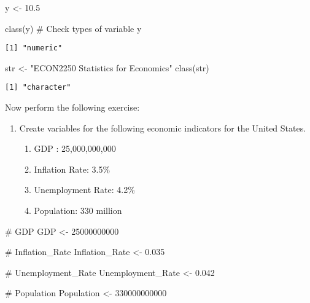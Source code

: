 \documentclass[
  letterpaper,
  DIV=11,
  numbers=noendperiod]{scrartcl}
\newenvironment{Shaded}{\begin{snugshade}}{\end{snugshade}}
\newcommand{\CommentTok}[1]{\textcolor[rgb]{0.37,0.37,0.37}{#1}}
\newcommand{\DecValTok}[1]{\textcolor[rgb]{0.68,0.00,0.00}{#1}}
\newcommand{\FloatTok}[1]{\textcolor[rgb]{0.68,0.00,0.00}{#1}}
\newcommand{\FunctionTok}[1]{\textcolor[rgb]{0.28,0.35,0.67}{#1}}
\newcommand{\NormalTok}[1]{\textcolor[rgb]{0.00,0.23,0.31}{#1}}
\newcommand{\OtherTok}[1]{\textcolor[rgb]{0.00,0.23,0.31}{#1}}
\newcommand{\StringTok}[1]{\textcolor[rgb]{0.13,0.47,0.30}{#1}}
\providecommand{\tightlist}{%
  \setlength{\itemsep}{0pt}\setlength{\parskip}{0pt}}\usepackage{longtable,booktabs,array}
\begin{document}
\begin{Shaded}
\begin{Highlighting}[]
\NormalTok{y }\OtherTok{\textless{}{-}} \FloatTok{10.5}

\FunctionTok{class}\NormalTok{(y) }\CommentTok{\# Check types of variable y}
\end{Highlighting}
\end{Shaded}

\begin{verbatim}
[1] "numeric"
\end{verbatim}

\begin{Shaded}
\begin{Highlighting}[]
\NormalTok{str }\OtherTok{\textless{}{-}} \StringTok{"ECON2250 Statistics for Economics"}
\FunctionTok{class}\NormalTok{(str)}
\end{Highlighting}
\end{Shaded}

\begin{verbatim}
[1] "character"
\end{verbatim}

Now perform the following exercise:

\begin{enumerate}
\def\labelenumi{\arabic{enumi}.}
\tightlist
\item
  Create variables for the following economic indicators for the United
  States.

  \begin{enumerate}
  \def\labelenumii{\alph{enumii}.}
  \tightlist
  \item
    GDP : 25,000,000,000
  \item
    Inflation Rate: 3.5\%
  \item
    Unemployment Rate: 4.2\%
  \item
    Population: 330 million
  \end{enumerate}
\end{enumerate}

\begin{Shaded}
\begin{Highlighting}[]
\CommentTok{\# GDP}
\NormalTok{GDP }\OtherTok{\textless{}{-}} \DecValTok{25000000000}
    
\CommentTok{\# Inflation\_Rate}
\NormalTok{Inflation\_Rate }\OtherTok{\textless{}{-}} \FloatTok{0.035}
    
\CommentTok{\# Unemployment\_Rate}
\NormalTok{Unemployment\_Rate }\OtherTok{\textless{}{-}} \FloatTok{0.042}

\CommentTok{\# Population}
\NormalTok{Population }\OtherTok{\textless{}{-}} \DecValTok{330000000000}
\end{Highlighting}
\end{Shaded}
\end{document}
